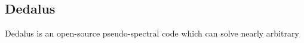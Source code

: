 {\color{purple}    
\subsection{Dedalus}}

Dedalus is an open-source pseudo-spectral code which can solve nearly arbitrary  
